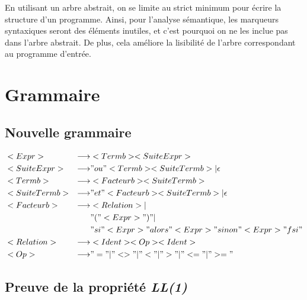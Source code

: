 \documentclass[a4paper,11pt]{article}
\begin{document}
En utilisant un arbre abstrait, on se limite au strict minimum pour \'ecrire la structure d'un programme. Ainsi, pour l'analyse s\'emantique, les marqueurs syntaxiques seront des \'el\'ements inutiles, et c'est pourquoi on ne les inclue pas dans l'arbre abstrait.
De plus, cela am\'eliore la lisibilit\'e de l'arbre correspondant au programme d'entr\'ee.

\section{Grammaire}

\subsection{Nouvelle grammaire}

\begin{align}
&<Expr>       & \longrightarrow & <Termb> <SuiteExpr> \\
&<SuiteExpr>  & \longrightarrow & "ou" <Termb> <SuiteTermb> | \epsilon \\
&<Termb>      & \longrightarrow & <Facteurb> <SuiteTermb>\\
&<SuiteTermb> & \longrightarrow & "et" <Facteurb> <SuiteTermb> | \epsilon \\
&<Facteurb>   & \longrightarrow & <Relation> | \\
&             &                 & "(" <Expr> ")" |\\
&             &                 & "si" <Expr> "alors" <Expr> "sinon" <Expr> "fsi" \\
&<Relation>   & \longrightarrow & <Ident> <Op> <Ident> \\
&<Op>         & \longrightarrow & "=" | "<>" | "<" | ">" | "<=" | ">="
\end{align}

\subsection{Preuve de la propri\'et\'e \emph{LL(1)}}
\end{document}
